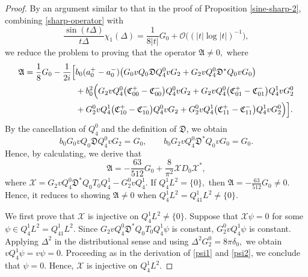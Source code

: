 \documentclass[reqno]{amsart}
\numberwithin{equation}{section}
\begin{document}
\begin{proof}
	By an argument similar to that in the proof of Proposition \ref{sine-sharp-2},  combining  \eqref{sharp-operator}  with  $$\frac{\sin(t\Delta)}{t\Delta}\chi_1(\Delta)
	=\frac{1}{8 |t|}G_0+\mathcal{O}\bigl(({|t|\log|t|})^{-1}\bigr),$$
we reduce the problem to proving that the operator $\mathfrak{A}\neq0,$ where
	\begin{align*}
		\mathfrak{A}=\frac{1}{8}G_0-\frac{1}{2i}\Bigl[ & b_0(a_0^+-a_0^-)\bigl(G_0vQ_0\mathfrak{D}Q_4^0vG_2+G_2vQ_4^0\mathfrak{D}^*Q_0vG_0\bigr)\\
		&+b_0^2\Bigl(G_2vQ_4^0\bigl(\mathfrak{C}_{00}^+-\mathfrak{C}_{00}^-\bigr)Q_4^0vG_2+G_2vQ_4^0\bigl(\mathfrak{C}_{01}^+-\mathfrak{C}_{01}^-\bigr)Q_4^1vG^0_2\\
		&+G^0_2vQ_4^1\bigl(\mathfrak{C}_{10}^+-\mathfrak{C}_{10}^-\bigr)Q_4^0vG_2+G^0_2vQ_4^1\bigl(\mathfrak{C}_{11}^+-\mathfrak{C}_{11}^-\bigr)Q_4^1vG^0_2\Bigr)\Bigr].
	\end{align*}
	By the cancellation of $Q_4^0$ and the  definition of 
	$\mathfrak{D}$, we obtain
	\begin{equation*}
		b_0G_0vQ_0\mathfrak{D}Q_4^0vG_2
		=
		G_0,
		\qquad
		b_0G_2vQ_4^0\mathfrak{D}^*Q_0vG_0
		=
		G_0.
	\end{equation*}
Hence, by calculating, we derive that 
		\begin{equation*}
		\mathfrak{A}
		=
		-\frac{63}{512}G_0
		+
		\frac{8}{\pi^2}
		\mathcal{X}D_0\mathcal{X}^*,
	\end{equation*}
	where $	\mathcal{X}
	=
	G_2vQ_4^0\mathfrak{D}^*Q_0T_0Q_4^1
	-
	G_2^0vQ_4^1.$ If $Q_4^1L^2=\{0\},$ then $	\mathfrak{A}=	-\frac{63}{512}G_0\neq0.$ Hence, it reduces to showing $\mathfrak{A}\neq0$ when $Q_4^1L^2=Q_{41}^1L^2\neq\{0\}.$
	
	
	
We first  prove that
	$\mathcal{X}$ is
	injective on $Q_4^1L^2\neq\{0\}.$
	Suppose that $\mathcal{X}\psi=0$ for some
	$\psi\in Q_4^1L^2=Q_{41}^1L^2$. Since
	$
	G_2vQ_4^0\mathfrak{D}^*Q_0T_0Q_4^1\psi
	$
	is constant, 
	$
	G_2^0vQ_4^1\psi
	$
	is constant. Applying $\Delta^2$ in the distributional sense and
	using
	$
	\Delta^2G_2^0
	=
	8\pi\delta_0,
	$
	we obtain
	$
	vQ_4^1\psi=v\psi=0.
	$  Proceeding as in the derivation of \eqref{psi1} and \eqref{psi2}, we conclude that \(\psi=0\).
	 Hence, $\mathcal{X}$ is
	injective on $Q_4^1L^2$.
	



\end{proof}
\end{document}
